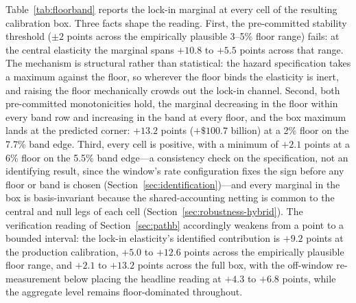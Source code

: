 \documentclass[12pt]{article}
\begin{document}
Table~\ref{tab:floorband} reports the lock-in marginal at every cell of the resulting calibration box. Three facts shape the reading. First, the pre-committed stability threshold ($\pm 2$ points across the empirically plausible 3--5\% floor range) fails: at the central elasticity the marginal spans $+10.8$ to $+5.5$ points across that range. The mechanism is structural rather than statistical: the hazard specification takes a maximum against the floor, so wherever the floor binds the elasticity is inert, and raising the floor mechanically crowds out the lock-in channel. Second, both pre-committed monotonicities hold, the marginal decreasing in the floor within every band row and increasing in the band at every floor, and the box maximum lands at the predicted corner: $+13.2$ points ($+\$100.7$ billion) at a 2\% floor on the 7.7\% band edge. Third, every cell is positive, with a minimum of $+2.1$ points at a 6\% floor on the 5.5\% band edge---a consistency check on the specification, not an identifying result, since the window's rate configuration fixes the sign before any floor or band is chosen (Section~\ref{sec:identification})---and every marginal in the box is basis-invariant because the shared-accounting netting is common to the central and null legs of each cell (Section~\ref{sec:robustness-hybrid}). The verification reading of Section~\ref{sec:pathb} accordingly weakens from a point to a bounded interval: the lock-in elasticity's identified contribution is $+9.2$ points at the production calibration, $+5.0$ to $+12.6$ points across the empirically plausible floor range, and $+2.1$ to $+13.2$ points across the full box, with the off-window re-measurement below placing the headline reading at $+4.3$ to $+6.8$ points, while the aggregate level remains floor-dominated throughout.
\end{document}
